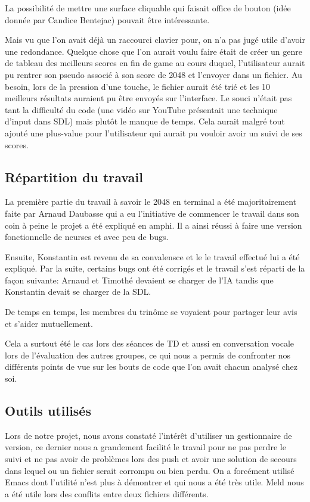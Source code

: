 \documentclass{article}
\begin{document}
La possibilité de mettre une surface cliquable qui faisait office de bouton (idée donnée par Candice Bentejac) pouvait être intéressante.

Mais vu que l'on avait déjà un raccourci clavier pour, on n'a pas jugé utile d'avoir une redondance. 
Quelque chose que l'on aurait voulu faire était de créer un genre de tableau des meilleurs scores en fin de game au cours duquel, l'utilisateur aurait pu rentrer son pseudo associé à son score de 2048 et l'envoyer dans un fichier. Au besoin, lors de la pression d'une touche, le fichier aurait été trié et les 10 meilleurs résultats auraient pu être envoyés sur l'interface. Le souci n'était pas tant la difficulté du code (une vidéo sur YouTube présentait une technique d'input dans SDL) mais plutôt le manque de temps. Cela aurait malgré tout ajouté une plus-value pour l'utilisateur qui aurait pu vouloir avoir un suivi de ses scores.

\subsection{Répartition du travail}
La première partie du travail à savoir le 2048 en terminal a été majoritairement faite par Arnaud Daubasse qui a eu l'initiative de commencer le travail dans son coin à peine le projet a été expliqué en amphi. Il a ainsi réussi à faire une version fonctionnelle de ncurses et avec peu de bugs.

Ensuite, Konstantin est revenu de sa convalensce et le le travail effectué lui a été expliqué. Par la suite, certains bugs ont été corrigés et le travail s'est réparti de la façon suivante: Arnaud et Timothé devaient se charger de l'IA tandis que Konstantin devait se charger de la SDL.

De temps en temps, les membres du trinôme se voyaient pour partager leur avis et s'aider mutuellement.

Cela a surtout été le cas lors des séances de TD et aussi en conversation vocale lors de l'évaluation des autres groupes, ce qui nous a permis de confronter nos différents points de vue sur les bouts de code que l'on avait chacun analysé chez soi.

\subsection{Outils utilisés}
Lors de notre projet, nous avons constaté l'intérêt d'utiliser un gestionnaire de version, ce dernier nous a grandement facilité le travail pour ne pas perdre le suivi et ne pas avoir de problèmes lors 
des push et avoir une solution de secours dans lequel ou un fichier serait corrompu ou bien perdu.
On a forcément utilisé Emacs dont l'utilité n'est plus à démontrer et qui nous a été très utile.
Meld nous a été utile lors des conflits entre deux fichiers différents.
\end{document}
